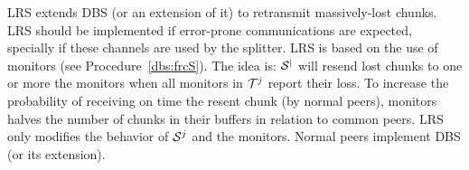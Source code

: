 LRS extends DBS (or an extension of it) to retransmit massively-lost
chunks. LRS should be implemented if error-prone communications are
expected, specially if these channels are used by the splitter. LRS is
based on the use of monitors (see Procedure~\ref{dbs:frcS}). The idea
is: ${\cal S^j}$ will resend lost chunks to one or more the monitors
when all monitors in ${\cal T}^j$ report their loss. To increase the
probability of receiving on time the resent chunk (by normal peers),
monitors halves the number of chunks in their buffers in relation to
common peers. LRS only modifies the behavior of ${\cal S}^j$ and the
monitors. Normal peers implement DBS (or its extension).

\begin{comment}
LRS should be used when it is expected to have loss-prone
communication links or when the bit-rate of the stream exceeds the
uploading capacity of the nodes. Notice that the impact of using LSR
for normal peers is null.

P2PSP relies in UDP to transmit the chunks, and obviously, packet
losses can happen. The impact of a packet loss in the QoS provided
depends on where the packets are lost and who lost it. If a packet is
lost in its trip between the splitter and a peer, this packet will be
missed by all the team.

\subsubsection{Monitor peers}
The overlay administrator can create some special peers called, in
short,\emph{monitors}. These peers are introduced to the rest of peers
of the team as normal peers and behave like the rest of well-intended
peers, churn included. Monitor peers can be asked by the splitter to
check whether the operation of the team has and is been correct.

\subsubsection{Selfish peers rejection}
Another functionality of monitors is to tell the splitter which chunks
have not been received on time (the consequence of receiving a lost
too late is the same than not receiving it never). The splitter
memorizes which chunk has been sent to each peer in the current
round. If all monitors reports that a chunk has been lost, the
splitter can determine which peer has been in charge of broadcasting
that chunk and take note of this. If this problem happens a given
number of times, the splitter can expell the unreliable peer from the
team by stop sending to it futher chunks.


\end{comment}
